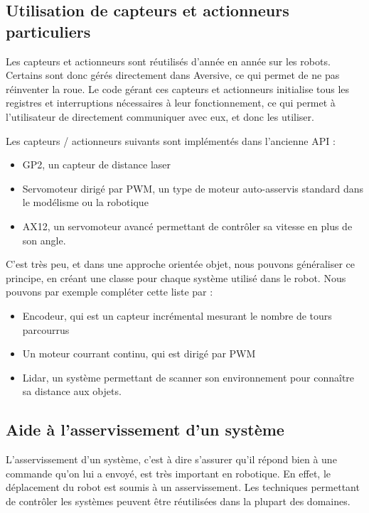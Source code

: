 \subsection{Utilisation de capteurs et actionneurs particuliers}

Les capteurs et actionneurs sont réutilisés d'année en année sur les robots. Certains sont donc gérés directement dans Aversive, ce qui permet de ne pas réinventer la roue. Le code gérant ces capteurs et actionneurs initialise tous les registres et interruptions nécessaires à leur fonctionnement, ce qui permet à l'utilisateur de directement communiquer avec eux, et donc les utiliser.

Les capteurs / actionneurs suivants sont implémentés dans l'ancienne API :
\begin{itemize}
    \item{GP2, un capteur de distance laser}
    \item{Servomoteur dirigé par PWM, un type de moteur auto-asservis standard dans le modélisme ou la robotique}
    \item{AX12, un servomoteur avancé permettant de contrôler sa vitesse en plus de son angle.}
\end{itemize}

C'est très peu, et dans une approche orientée objet, nous pouvons généraliser ce principe, en créant une classe pour chaque système utilisé dans le robot. Nous pouvons par exemple compléter cette liste par : 

\begin{itemize}
    \item{Encodeur, qui est un capteur incrémental mesurant le nombre de tours parcourrus}
    \item{Un moteur courrant continu, qui est dirigé par PWM}
    \item{Lidar, un système permettant de scanner son environnement pour connaître sa distance aux objets.}
\end{itemize}


\subsection{Aide à l'asservissement d'un système}

L'asservissement d'un système, c'est à dire s'assurer qu'il répond bien à une commande qu'on lui a envoyé, est très important en robotique. En effet, le déplacement du robot est soumis à un asservissement. Les techniques permettant de contrôler les systèmes peuvent être réutilisées dans la plupart des domaines.

